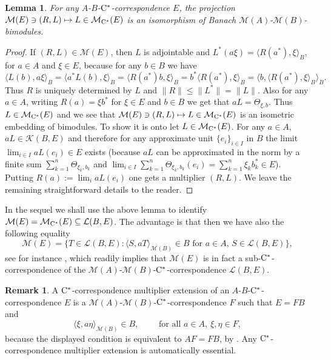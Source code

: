 \documentclass[11 pt, leqno]{amsart}
\numberwithin{equation}{section}
\theoremstyle{plain}
\newtheorem {lem} [thm]{Lemma}
\theoremstyle{definition}
\newtheorem {rem} [thm]{Remark}
\newcommand{\M}{\mathcal M}
\newcommand{\K}{\mathcal{K}}
\renewcommand{\L}{\mathcal L}
\newcommand{\cst}{\ifmmode\mathrm{C}^*\else{$\mathrm{C}^*$}\fi}
\begin{document}
\begin{lem}
For any $A$-$B$-$\cst$-correspondence $E$, the projection $\M(E)\ni (R,L)\mapsto L \in \M_{\cst}(E)$ is an isomorphism of Banach $\M(A)$-$\M(B)$-bimodules.
\end{lem}
\begin{proof}
If $(R,L) \in \M(E)$, then $L$ is adjointable and $L^*(a\xi)=\langle R(a^*),\xi\rangle_{B}$, for $a\in A$ and $\xi\in E$, because for any $b\in B$ we have 
\[
    \langle L(b) ,a\xi\rangle_{B}=\langle a^* L(b),\xi\rangle_{B}=\langle R(a^*)b,\xi\rangle_{B}= b^*\langle R(a^*),\xi\rangle_{B}= \langle b, \langle R(a^*),\xi\rangle_{B}\rangle_{B}.
\]
Thus $R$ is uniquely determined by $L$ and $\|R\|\leq \|L^*\|=\|L\|$. 
Also for any $a\in A$, writing $R(a)=\xi b^*$ for $\xi\in E$ and $b\in B$ we get that 
$a L=\Theta_{\xi,b}$. 
Thus $L\in \M_{\cst}(E)$ and we see that  $\M(E)\ni (R,L)\mapsto L \in \M_{\cst}(E)$ is an isometric embedding of bimodules.  
To show it is onto let $L\in \M_{\cst}(E)$. 
For any $a\in A$, $aL\in \K(B,E)$ and therefore for any approximate unit $\{e_i\}_{i \in I}$ in $B$ the limit $\lim_{i\in I} aL(e_i)\in E$ exists (because $aL$ can be  approximated in the norm by a finite sum $\sum_{k=1}^n\Theta_{\xi_k,b_k}$ and $\lim_{i\in I} \sum_{k=1}^n\Theta_{\xi_k,b_k}(e_i)=\sum_{k=1}^n \xi_kb_k^*\in E$). 
Putting $R(a):=\lim_{i} aL(e_i)$ one gets a multiplier $(R,L)$. 
We leave the remaining straightforward details to the reader.
\end{proof}

In the sequel we shall use the above lemma to identify $\M(E)=\M_{\cst}(E) \subseteq \L(B,E)$. 
The advantage is that then we have also the following equality
\[
    \M(E)=\{T\in \L(B,E): \langle S, aT\rangle_{\M(B)}\in B \text{ for }a\in A,\, S\in \L(B,E)\},
\]
see for instance \cite[Proposition 1.3]{katsura2}, which readily implies that $\M(E)$ is in fact a sub-$\cst$-correspondence of the  $\M(A)$-$\M(B)$-$\cst$-correspondence $\L(B,E)$.

\begin{rem} 
A $\cst$-correspondence multiplier extension of an $A$-$B$-$\cst$-correspondence $E$ is a $\M(A)$-$\M(B)$-$\cst$-correspondence $F$ such that $E=FB$ and 
\[
    \langle \xi, a \eta\rangle_{\M(B)}\in B, \qquad \text{ for all } a\in A,\  \xi, \eta \in F,
\]
because the displayed condition is equivalent to $AF=FB$, by \cite[Proposition 1.3]{katsura2}. 
Any $\cst$-correspondence multiplier extension is automatically essential.
\end{rem}
\end{document}
